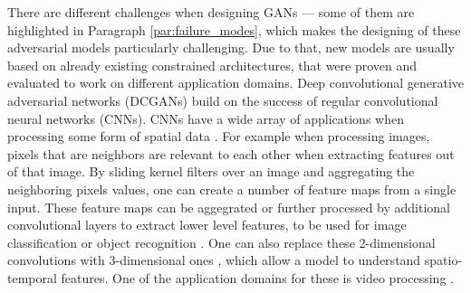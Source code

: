 There are different challenges when designing GANs --- some of them are highlighted in Paragraph \ref{par:failure_modes}, which makes the designing of these adversarial models particularly challenging. Due to that, new models are usually based on already existing constrained architectures, that were proven and evaluated to work on different application domains. Deep convolutional generative adversarial networks (DCGANs) \cite{radford2015unsupervised} build on the success of regular convolutional neural networks (CNNs). CNNs have a wide array of applications when processing some form of spatial data \cite{ciregan2012multi}. For example when processing images, pixels that are neighbors are relevant to each other when extracting features out of that image. By sliding kernel filters over an image and aggregating the neighboring pixels values, one can create a number of feature maps from a single input. These feature maps can be aggegrated or further processed by additional convolutional layers to extract lower level features, to be used for image classification or object recognition \cite{krizhevsky2017imagenet}. One can also replace these 2-dimensional convolutions with 3-dimensional ones \cite{tran2015learning, ji20123d}, which allow a model to understand spatio-temporal features. One of the application domains for these is video processing \cite{simonyan2014two}.

